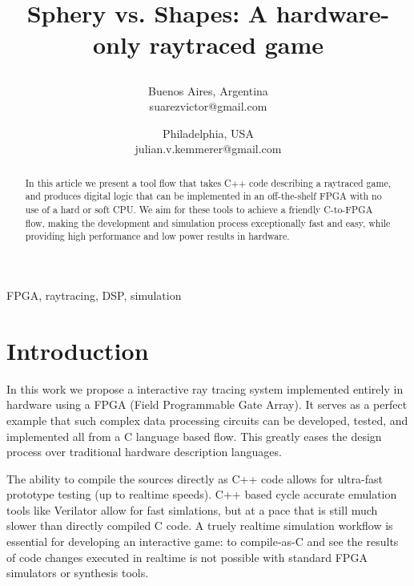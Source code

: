 \documentclass[conference]{IEEEtran}
\begin{document}
\title{Sphery vs. Shapes: A hardware-only raytraced game\\

\author{
Buenos Aires, Argentina \\
suarezvictor@gmail.com
\and
{}
Philadelphia, USA \\
julian.v.kemmerer@gmail.com
}}

\maketitle

\begin{abstract}
In this article we present a tool flow that takes C++ code describing a raytraced game, and produces digital logic that can be implemented in an off-the-shelf FPGA with no use of a hard or soft CPU. We aim for these tools to achieve a friendly C-to-FPGA flow, making the development and simulation process exceptionally fast and easy, while providing high performance and low power results in hardware.
\end{abstract}

\begin{IEEEkeywords}
FPGA, raytracing, DSP, simulation
\end{IEEEkeywords}

\section{Introduction}
In this work we propose a interactive ray tracing system implemented entirely in hardware using a FPGA (Field Programmable Gate Array). It  serves as a perfect example that such complex data processing circuits can be developed, tested, and implemented all from a C language based flow. This greatly eases the design process over traditional hardware description languages.

The ability to compile the sources directly as C++ code allows for ultra-fast prototype testing (up to realtime speeds). C++ based cycle accurate emulation tools like Verilator\cite{verilator} allow for fast simlations, but at a pace that is still much slower than directly compiled C code. A truely realtime simulation workflow is essential for developing an interactive game: to compile-as-C and see the results of code changes executed in realtime is not possible with standard FPGA simulators or synthesis tools.
\end{document}
